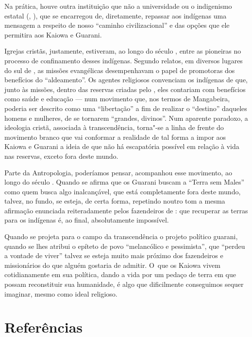 Na prática, houve outra instituição que não a universidade ou o
indigenismo estatal (, ), que se encarregou de, diretamente,
repassar aos indígenas uma mensagem a respeito de nosso ``caminho
civilizacional'' e das opções que ele permitira aos Kaiowa e Guarani. 

Igrejas cristãs, justamente, estiveram, ao longo do século , entre as
pioneiras no processo de confinamento desses indígenas. Segundo
relatos, em diversos lugares do sul de , as missões evangélicas
desempenhavam o papel de promotoras dos benefícios do ``aldeamento''. Os
agentes religiosos convenciam os indígenas de que, junto às missões,
dentro das reservas criadas pelo , eles contariam com benefícios
como saúde e educação --- num movimento que, nos termos de Mangabeira,
poderia ser descrito como uma ``libertação'' a fim de realizar o
``destino'' daqueles homens e mulheres, de se tornarem ``grandes,
divinos''. Num aparente paradoxo, a ideologia cristã, associada à
transcendência, torna"-se a linha de frente do movimento branco que vai
conformar a realidade de tal forma a impor aos Kaiowa e Guarani a ideia
de que não há escapatória possível em relação à vida nas reservas,
exceto fora deste mundo. 

Parte da Antropologia, poderíamos pensar, acompanhou esse movimento, ao
longo do século . Quando se afirma que os Guarani buscam a ``Terra sem
Males'' como quem busca algo inalcançável, que está completamente fora
deste mundo, talvez, no fundo, se esteja, de certa forma, repetindo
noutro tom a mesma afirmação enunciada reiteradamente pelos fazendeiros
de : que recuperar as terras para os indígenas é, ao final,
absolutamente impossível.

Quando se projeta para o campo da transcendência o projeto político
guarani, quando se lhes atribui o epíteto de povo ``melancólico e
pessimista'', que ``perdeu a vontade de viver'' talvez se esteja muito
mais próximo dos fazendeiros e missionários do que alguém gostaria de
admitir. O~que os Kaiowa vivem cotidianamente em sua política, dando a
vida por um pedaço de terra em que possam reconstituir sua humanidade,
é algo que dificilmente conseguimos sequer imaginar, mesmo como ideal
religioso.

\section{Referências}

